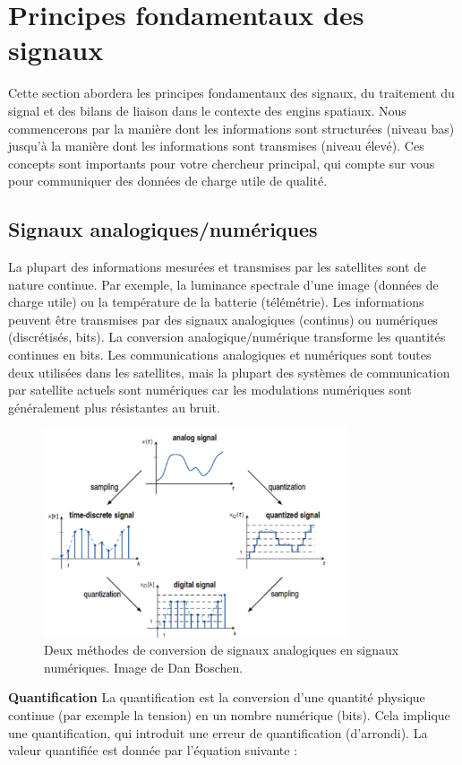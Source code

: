 \section{Principes fondamentaux des signaux}
Cette section abordera les principes fondamentaux des signaux, du traitement du signal et des bilans de liaison dans le contexte des engins spatiaux. Nous commencerons par la manière dont les informations sont structurées (niveau bas) jusqu'à la manière dont les informations sont transmises (niveau élevé). Ces concepts sont importants pour votre chercheur principal, qui compte sur vous pour communiquer des données de charge utile de qualité.
\subsection{Signaux analogiques/numériques}
La plupart des informations mesurées et transmises par les satellites sont de nature continue. Par exemple, la luminance spectrale d'une image (données de charge utile) ou la température de la batterie (télémétrie). Les informations peuvent être transmises par des signaux analogiques (continus) ou numériques (discrétisés, bits). La conversion analogique/numérique transforme les quantités continues en bits. Les communications analogiques et numériques sont toutes deux utilisées dans les satellites, mais la plupart des systèmes de communication par satellite actuels sont numériques car les modulations numériques sont généralement plus résistantes au bruit.
\begin{figure}[H] %
    \centering
    \includegraphics[width=0.8\textwidth]{figures/6-15.jpg}
    \caption{Deux méthodes de conversion de signaux analogiques en signaux numériques. Image de Dan Boschen.}
    \label{fig:communication2}
\end{figure}
\textbf{Quantification}
La quantification est la conversion d'une quantité physique continue (par exemple la tension) en un nombre numérique (bits). Cela implique une quantification, qui introduit une erreur de quantification (d'arrondi). La valeur quantifiée est donnée par l'équation suivante :
